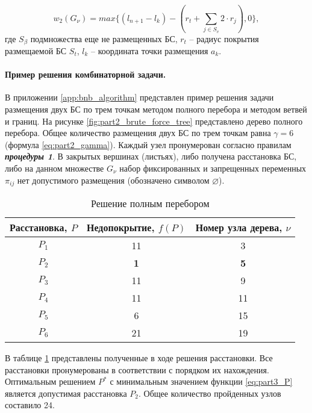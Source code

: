 \begin{equation}\label{eq2}
  w_2 \left(G_\nu \right) = max\{\left(l_{n+1}-l_k\right)-(r_t+\sum_{j\in S_v}{2 \cdot r_j}),0\},
\end{equation}
где $S_\beta$ подмножества еще не размещенных БС, $r_t$ -- радиус покрытия размещаемой БС $S_t$, $l_k$ -- координата точки размещения $a_k$.

\paragraph{Пример решения комбинаторной задачи.}

В приложении \cref{app:bnb_algorithm} представлен пример решения задачи размещения двух БС  по трем точкам методом полного перебора и методом ветвей и границ. На рисунке \cref{fig:part2_brute_force_tree} представлено дерево полного перебора. Общее количество размещения двух БС по трем точкам равна $\gamma = 6$ (формула \cref{eq:part2_gamma}). Каждый узел пронумерован согласно правилам \textit{\textbf{процедуры 1}}. В закрытых вершинах (листьях), либо получена расстановка БС, либо на данном множестве $G_\nu$ набор фиксированных и запрещенных переменных $\pi_{ij}$ нет допустимого размещения (обозначено символом $\varnothing$).

\begin{table}[h!]\centering
  \begin{tabular}{|c|c|c|}\hline
      
      Расстановка, $P$ & Недопокрытие, $f(P)$ & Номер узла дерева, $\nu$\\
      \hline
      $P_1$ & 11 & 3\\
      \textit{\textbf{$P_2$}} & \textbf{1} & \textbf{5}\\
      $P_3$ & 11 & 9\\
      $P_4$ & 11 & 11\\
      $P_5$ & 6 & 15\\
      $P_6$ & 21 & 19\\
      \hline

\end{tabular}\caption{Решение полным перебором}\label{tab:brute_force_solution}
\end{table}

В таблице \cref{tab:brute_force_solution} представлены полученные в ходе решения расстановки. Все расстановки пронумерованы в соответствии с порядком их нахождения. Оптимальным решением $P^*$ с минимальным значением функции \cref{eq:part3_P} является допустимая расстановка $P_2$. Общее количество пройденных узлов составило 24.


